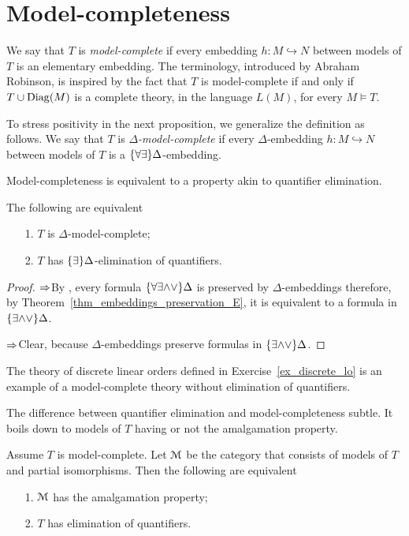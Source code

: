 \section{Model-completeness}

We say that $T$ is \emph{model-complete\/} if every embedding $h:M\hookrightarrow N$ between models of $T$ is an elementary embedding. The terminology, introduced by Abraham Robinson, is inspired by the fact that $T$ is model-complete if and only if $T\cup{\rm Diag}(M)$ is a complete theory, in the language $L(M)$, for every $M\models T$. 

To stress positivity in the next proposition, we generalize the definition as follows. We say that $T$ is \emph{$\Delta$-model-complete\/} if every $\Delta$-embedding $h:M\hookrightarrow N$ between models of $T$ is a $\{\forall\exists\}\Delta$-embedding. 

Model-completeness is equivalent to a property akin to quantifier elimination.

\begin{proposition}
The following are equivalent
\begin{itemize}
\item[1.] $T$ is $\Delta$-model-complete;
\item[2.] $T$ has $\{\exists\}\Delta$-elimination of quantifiers.
\end{itemize}
\end{proposition}

\begin{proof}
$\Rightarrow$\quad By , every formula $\{\forall\exists\mathord\wedge\mathord\vee\}\Delta$ is preserved by $\Delta$-embeddings therefore, by Theorem~\ref{thm_embeddings_preservation_E}, it is equivalent to a formula in $\{\exists\mathord\wedge\mathord\vee\}\Delta$.

$\Rightarrow$\quad Clear, because $\Delta$-embeddings preserve formulas in $\{\exists\mathord\wedge\mathord\vee\}\Delta$.
\end{proof}

The theory of discrete linear orders defined in Exercise~\ref{ex_discrete_lo} is an example of a model-complete theory without elimination of quantifiers.


The difference between quantifier elimination and model-completeness subtle. It boils down to models of $T$ having or not the amalgamation property.

\begin{proposition}
Assume $T$ is model-complete. Let $\EuScript M$ be the category that consists of models of $T$ and partial isomorphisms. Then the following are equivalent
\begin{itemize}
\item[1.] $\EuScript M$ has the amalgamation property;
\item[2.] $T$ has elimination of quantifiers.
\end{itemize}
\end{proposition}

